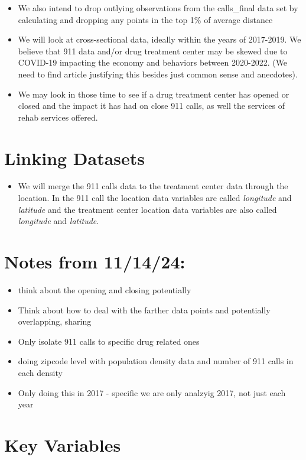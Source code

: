 \documentclass[12pt]{article}
\begin{document}
\begin{itemize}
\item We also intend to drop outlying observations from the calls\_final data set by calculating and dropping any points in the top 1\% of average distance
\item We will look at cross-sectional data, ideally within the years of 2017-2019. We believe that 911 data and/or drug treatment center may be skewed due to COVID-19 impacting the economy and behaviors between 2020-2022. (We need to find article justifying this besides just common sense and anecdotes). 
\item We may look in those time to see if a drug treatment center has opened or closed and the impact it has had on close 911 calls, as well the services of rehab services offered. 
\end{itemize}

\section{Linking Datasets}
\label{sec:discussion}

\begin{itemize}
    \item We will merge the 911 calls data to the treatment center data through the location. In the 911 call the location data variables are called \textit{longitude} and \textit{latitude} and the treatment center location data variables are also called \textit{longitude} and \textit{latitude}.
\end{itemize}

\section{Notes from 11/14/24:}
\begin{itemize}
    \item think about the opening and closing potentially
    \item Think about how to deal with the farther data points and potentially overlapping, sharing
    \item Only isolate 911 calls to specific drug related ones 
    \item doing zipcode level with population density data and number of 911 calls in each density
    \item Only doing this in 2017 - specific we are only analzyig 2017, not just each year
\end{itemize}

\section{Key Variables}
\label{sec:result}
\end{document}

